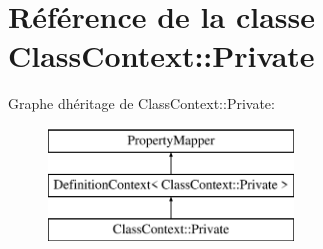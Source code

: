 \hypertarget{class_class_context_1_1_private}{}\section{Référence de la classe Class\+Context\+:\+:Private}
\label{class_class_context_1_1_private}
Graphe d\textquotesingle{}héritage de Class\+Context\+:\+:Private\+:\begin{figure}[H]
\begin{center}
\leavevmode
\includegraphics[height=3.000000cm]{class_class_context_1_1_private}
\end{center}
\end{figure}
